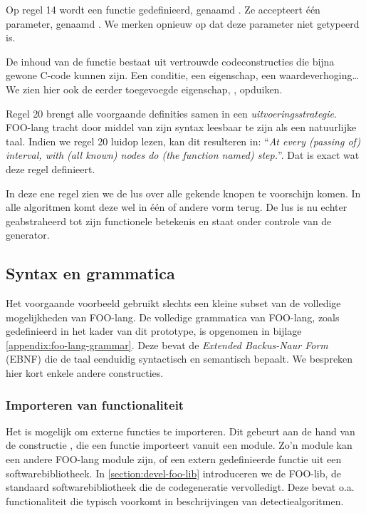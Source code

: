 Op regel 14 wordt een functie gedefinieerd, genaamd . Ze accepteert
\'e\'en parameter, genaamd . We merken opnieuw op dat deze parameter
niet getypeerd is.

De inhoud van de functie bestaat uit vertrouwde codeconstructies die bijna
gewone C-code kunnen zijn. Een conditie, een eigenschap, een
waardeverhoging\dots We zien hier ook de eerder toegevoegde eigenschap,
, opduiken.

Regel 20 brengt alle voorgaande definities samen in een
\emph{uitvoeringsstrategie}. FOO-lang tracht door middel van zijn syntax
leesbaar te zijn als een natuurlijke taal. Indien we regel 20 luidop lezen, kan
dit resulteren in: ``\emph{At every (passing of) interval, with (all known)
nodes do (the function named) step.}''. Dat is exact wat deze regel definieert.

In deze ene regel zien we de lus over alle gekende knopen te voorschijn komen.
In alle algoritmen komt deze wel in \'e\'en of andere vorm terug. De lus is nu
echter geabstraheerd tot zijn functionele betekenis en staat onder controle van
de generator.

\subsection{Syntax en grammatica}
\label{subsection:devel-foo-lang-grammar}

Het voorgaande voorbeeld gebruikt slechts een kleine subset van de volledige
mogelijkheden van FOO-lang. De volledige grammatica van FOO-lang, zoals
gedefinieerd in het kader van dit prototype, is opgenomen in bijlage
\ref{appendix:foo-lang-grammar}. Deze bevat de \emph{Extended Backus-Naur Form}
(EBNF) die de taal eenduidig syntactisch en semantisch bepaalt. We bespreken
hier kort enkele andere constructies.

\vspace{-3mm}

\subsubsection{Importeren van functionaliteit}

Het is mogelijk om externe functies te importeren. Dit gebeurt aan de hand van
de constructie , die een functie importeert vanuit
een module. Zo'n module kan een andere FOO-lang module zijn, of een extern
gedefinieerde functie uit een softwarebibliotheek. In
\ref{section:devel-foo-lib} introduceren we de FOO-lib, de standaard
softwarebibliotheek die de codegeneratie vervolledigt. Deze bevat o.a.
functionaliteit die typisch voorkomt in beschrijvingen van detectiealgoritmen.

